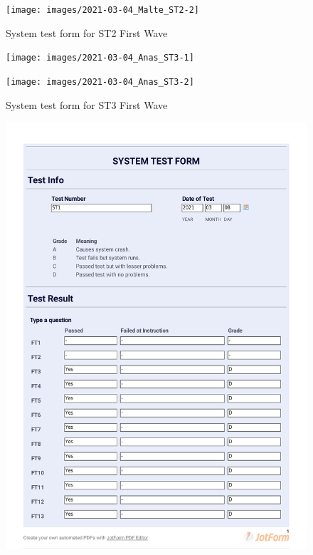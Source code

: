\documentclass{article}
\begin{document}
 \begin{figure}
     \centering
     \texttt{[image: images/2021-03-04\_Malte\_ST2-2]}
     \renewcommand\figurename{Figure}
     \caption{System test form for ST2 First Wave}
     \label{fig:my_label}
 \end{figure}
 

\begin{figure}
     \centering
     \texttt{[image: images/2021-03-04\_Anas\_ST3-1]}
     \renewcommand\figurename{Figure}
     \label{fig:my_label}
 \end{figure}
 
 \begin{figure}
     \centering
     \texttt{[image: images/2021-03-04\_Anas\_ST3-2]}
     \renewcommand\figurename{Figure}
     \caption{System test form for ST3 First Wave}
     \label{fig:my_label}
 \end{figure}
 
 \begin{figure}
     \centering
     \includegraphics[width=13cm]{images/2021-03-08_Alexander_ST1-1}
     \renewcommand\figurename{Figure}
     \label{fig:my_label}
 \end{figure}
 
\end{document}
